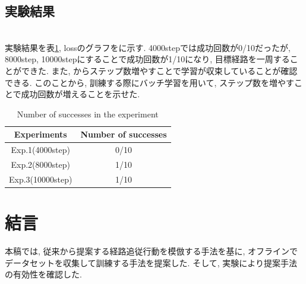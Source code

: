 \documentclass[10pt]{ujarticle}
\begin{document}
    \subsection{実験結果}\mbox{}\\
    実験結果を表\ref{tb:result}, lossのグラフをに示す. 4000stepでは成功回数が0/10だったが, 8000step, 10000stepにすることで成功回数が1/10になり, 目標経路を一周することができた. また, からステップ数増やすことで学習が収束していることが確認できる. このことから, 訓練する際にバッチ学習を用いて, ステップ数を増やすことで成功回数が増えることを示せた. 

    \begin{table}[h]
        \centering
        \begin{tabular}{|c|c|} \hline
          Experiments & Number of successes \\ \hline
          Exp.1(4000step) & 0/10 \\ \hline
          Exp.2(8000step) & 1/10 \\ \hline
          Exp.3(10000step) & 1/10 \\ \hline
        \end{tabular}
        \caption{Number of successes in the experiment}
        \label{tb:result}
      \end{table}

    \section{結\hspace{2zw}言}%
    本稿では, 従来から提案する経路追従行動を模倣する手法を基に, オフラインでデータセットを収集して訓練する手法を提案した. そして, 実験により提案手法の有効性を確認した. 
\end{document}
